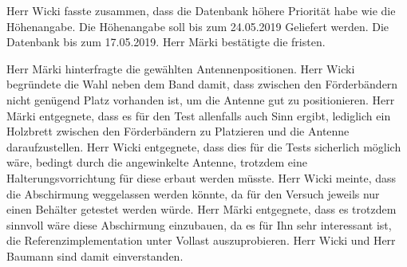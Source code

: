 \documentclass[parskip=full, a4paper]{scrreprt}
\begin{document}
Herr Wicki fasste zusammen, dass die Datenbank höhere Priorität habe wie die Höhenangabe. Die Höhenangabe soll bis zum 24.05.2019 Geliefert werden. Die Datenbank bis zum 17.05.2019. Herr Märki bestätigte die fristen.

Herr Märki hinterfragte die gewählten Antennenpositionen. Herr Wicki begründete die Wahl neben dem Band damit, dass zwischen den Förderbändern nicht genügend Platz vorhanden ist, um die Antenne gut zu positionieren. Herr Märki entgegnete, dass es für den Test allenfalls auch Sinn ergibt, lediglich ein Holzbrett zwischen den Förderbändern zu Platzieren und die Antenne daraufzustellen. Herr Wicki entgegnete, dass dies für die Tests sicherlich möglich wäre, bedingt durch die angewinkelte Antenne, trotzdem eine Halterungsvorrichtung für diese erbaut werden müsste. Herr Wicki meinte, dass die Abschirmung weggelassen werden könnte, da für den Versuch jeweils nur einen Behälter getestet werden würde. Herr Märki entgegnete, dass es trotzdem sinnvoll wäre diese Abschirmung einzubauen, da es für Ihn sehr interessant ist, die Referenzimplementation unter Vollast auszuprobieren. Herr Wicki und Herr Baumann sind damit einverstanden.
\end{document}
